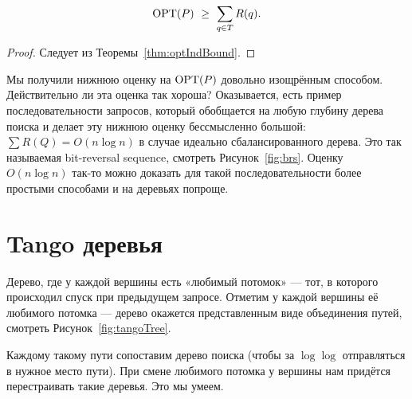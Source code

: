 \begin{theorem} \label{thm:optPereBound}
\begin{equation} \label{eq:optPereBound}
	\operatorname{OPT}(P)\ \ge\ \sum\limits_{q \in T} R(q).
\end{equation}
\end{theorem}

\begin{proof}
Следует из Теоремы~\ref{thm:optIndBound}.
\end{proof}

Мы получили нижнюю оценку на $\operatorname{OPT}(P)$ довольно изощрённым способом. Действительно ли эта оценка так хороша? Оказывается, есть пример последовательности запросов, который обобщается на любую глубину дерева поиска и делает эту нижнюю оценку бессмысленно большой: $\sum R(Q) = O(n \log n)$ в случае идеально сбалансированного дерева. Это так называемая bit-reversal sequence, смотреть Рисунок~\ref{fig:brs}. Оценку $O(n \log n)$ так-то можно доказать для такой последовательности более простыми способами и на деревьях попроще.



\section{Tango деревья} 

Дерево, где у каждой вершины есть «любимый потомок» — тот, в которого происходил спуск при предыдущем запросе. Отметим у каждой вершины её любимого потомка — дерево окажется представленным виде объединения путей, смотреть Рисунок~\ref{fig:tangoTree}.



Каждому такому пути сопоставим дерево поиска (чтобы за $\log \log$ отправляться в нужное место пути). При смене любимого потомка у вершины нам придётся перестраивать такие деревья. Это мы умеем.